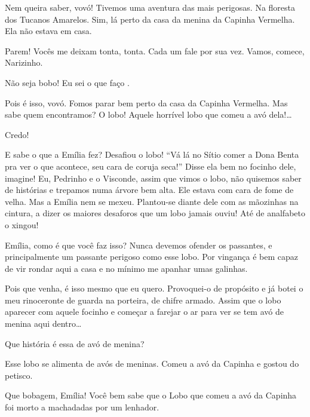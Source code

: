   Nem queira saber, vovó! Tivemos
uma aventura das mais perigosas. Na floresta dos Tucanos Amarelos. Sim,
lá perto da casa da menina da Capinha Vermelha. Ela não estava em casa.

  Parem! Vocês me
deixam tonta, tonta. Cada um fale por sua vez. Vamos, comece, Narizinho.

  Não seja bobo! Eu sei o que faço .

 Pois é isso, vovó. Fomos parar bem perto da casa da
Capinha Vermelha. Mas sabe quem encontramos? O lobo! Aquele horrível
lobo que comeu a avó dela!\ldots{}

  Credo!

  E sabe o que a Emília fez? Desafiou o
lobo! ``Vá lá no Sítio comer a Dona Benta pra ver o que acontece, seu
cara de coruja seca!'' Disse ela bem no focinho dele, imagine! Eu,
Pedrinho e o Visconde, assim que vimos o lobo, não quisemos saber de
histórias e trepamos numa árvore bem alta. Ele estava com cara de fome
de velha. Mas a Emília nem se mexeu. Plantou-se diante dele com as
mãozinhas na cintura, a dizer os maiores desaforos que um lobo jamais
ouviu! Até de analfabeto o xingou!

  Emília, como é que você faz isso?
Nunca devemos ofender os passantes, e principalmente um passante
perigoso como esse lobo. Por vingança é bem capaz de vir rondar aqui a
casa e no mínimo me apanhar umas galinhas.

 Pois que venha, é isso mesmo que eu quero. Provoquei-o de
propósito e já botei o meu rinoceronte de guarda na porteira, de chifre
armado. Assim que o lobo aparecer com aquele focinho e começar a farejar
o ar para ver se tem avó de menina aqui dentro\ldots{}

 Que história é essa de avó de menina?

 Esse lobo se alimenta de avós de meninas. Comeu a avó da
Capinha e gostou do petisco.

 Que bobagem, Emília! Você bem sabe que o Lobo que comeu a
avó da Capinha foi morto a machadadas por um lenhador.

